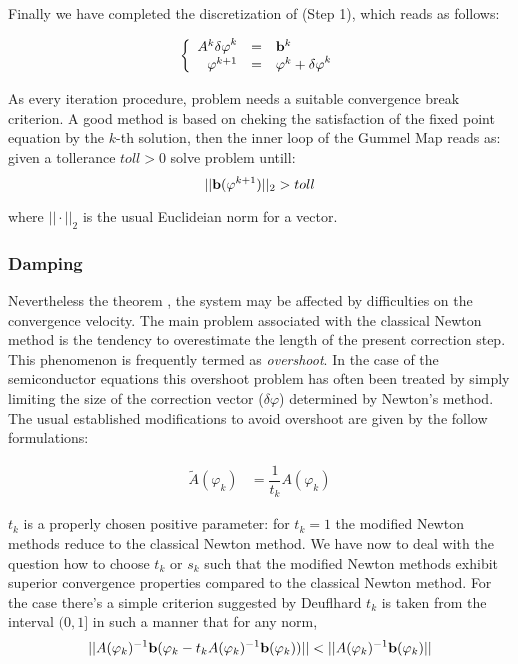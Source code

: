 Finally we have completed the discretization of (Step 1), which reads as follows:

\begin{equation}
\label{eq: NLP discretizated}
\left\{
\begin{array}{rcl}
A^k\mathbf{\delta \varphi}^k & = & \mathbf{b}^k \\
\mathbf{\varphi}^{k+1} & = & \mathbf{\varphi}^k +  \mathbf{\delta \varphi}^k 
\end{array}
\right.
\end{equation}

As every iteration procedure, problem  needs a suitable convergence break criterion. A good method is based on cheking the satisfaction of the fixed point equation  by the $k$-th solution, then the inner loop of the Gummel Map reads as: given a tollerance $toll>0$ solve problem  untill:
\begin{equation}
||\mathbf{b}(\varphi^{k+1})||_2 > toll
\end{equation}

where $||\cdot ||_2$ is the usual Euclideian norm for a vector.
\subsubsection{Damping}

Nevertheless the theorem , the system  may be affected by difficulties on the convergence velocity.
The main problem associated with the classical Newton method is the tendency to overestimate the length of the present correction step. This phenomenon is frequently termed as \textit{overshoot}. In the case of the semiconductor equations this overshoot problem has often been treated by simply limiting the size of the correction vector ($\delta \varphi$) determined by Newton's method. The usual established modifications to avoid overshoot are given by the follow formulations:


\begin{align}
\tilde{A}(\varphi_k)&=\dfrac{1}{t_k}A(\varphi_k) \label{eq: NLP mod used}
\end{align}

$t_k$ is a properly chosen positive parameter: for $t_k=1$ the modified Newton methods reduce to the classical Newton method. We have now to deal with the question how to choose $t_k$ or $s_k$ such that the modified Newton methods exhibit superior convergence properties compared to the classical Newton method.
For the case  there's a simple criterion suggested by Deuflhard \cite{selberherr:SimSem} $t_k$ is taken from the interval $(0,1]$ in such a manner that for any norm,
\begin{equation}
\label{eq: extended criterion}
||A(\varphi_k)^{-1}\vect{b}(\varphi_k-t_kA(\varphi_k)^{-1}\vect{b}(\varphi_k))||<||A(\varphi_k)^{-1}\vect{b}(\varphi_k)||
\end{equation}

